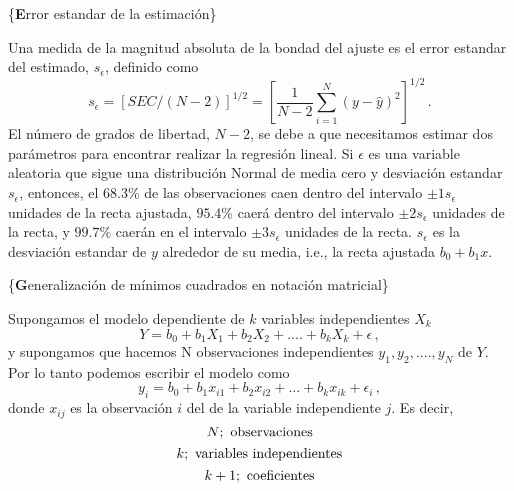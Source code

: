 \documentclass[
]{agujournal2019}
\begin{document}
\vspace{0.5cm}

\{\noindent \textbf Error estandar de la estimación\}

\noindent Una medida de la magnitud absoluta de la bondad del ajuste es
el error estandar del estimado, \(s_{\epsilon}\), definido como
\[s_{\epsilon}=[SEC/(N-2)]^{1/2}=\left[ \frac{1}{N-2}\sum\limits^N_{i=1} (y-\hat{y})^2\right]^{1/2}\,.\]
El número de grados de libertad, \(N-2\), se debe a que necesitamos
estimar dos parámetros para encontrar realizar la regresión lineal. Si
\({\epsilon}\) es una variable aleatoria que sigue una distribución
Normal de media cero y desviación estandar \(s_{\epsilon}\), entonces,
el \(68.3\%\) de las observaciones caen dentro del intervalo
\(\pm 1s_{\epsilon}\) unidades de la recta ajustada, \(95.4\%\) caerá
dentro del intervalo \(\pm 2 s_{\epsilon}\) unidades de la recta, y
\(99.7\%\) caerán en el intervalo \(\pm 3 s_{\epsilon}\) unidades de la
recta. \(s_{\epsilon}\) es la desviación estandar de \(y\) alrededor de
su media, i.e., la recta ajustada \(b_0 + b_1 x\).

\vspace{0.5cm}

\{\noindent \textbf Generalización de mínimos cuadrados en notación
matricial\}

\noindent Supongamos el modelo dependiente de \(k\) variables
independientes \(X_k\)
\[Y=b_0 + b_1 X_1 + b_2 X_2 + .... + b_k X_k + \epsilon\,,\] y
supongamos que hacemos N observaciones independientes
\(y_1, y_2,....,y_N\) de \(Y\). Por lo tanto podemos escribir el modelo
como
\[y_i=b_0 + b_1 x_{i1} + b_2 x_{i2} + ... + b_k x_{ik} + \epsilon_i\,,\]
donde \(x_{ij}\) es la observación \(i\) del de la variable
independiente \(j\). Es decir, \[N;\,\,{\rm observaciones}\]
\[k;\,\,{\rm variables\,\,independientes}\]
\[k+1;\,\,{\rm coeficientes}\]
\end{document}
